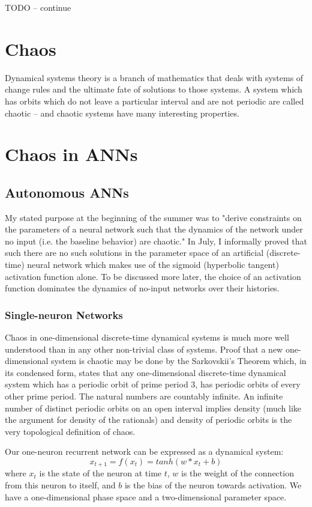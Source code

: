 \documentclass[12pt]{article}
\begin{document}
TODO -- continue

\section{Chaos}

Dynamical systems theory is a branch of mathematics that deals with systems 
of change rules and the ultimate fate of solutions to those systems.  A system
which has orbits which do not leave a particular interval and are not periodic
are called chaotic -- and chaotic systems have many interesting properties.

\section{Chaos in ANNs}
\subsection{Autonomous ANNs}
My stated purpose at the beginning of the summer was to "derive constraints
on the
parameters of a neural network such that the dynamics of the network under
no input (i.e. the baseline behavior) are chaotic."  In July,
I informally proved that such there are no such
solutions in the parameter space of an artificial (discrete-time) neural
network which makes use of the sigmoid (hyperbolic tangent) activation function
alone.  To be discussed more later, the choice of an activation function
dominates the dynamics of no-input networks over their histories.

\subsubsection{Single-neuron Networks}

Chaos in one-dimensional discrete-time dynamical systems is much more well
understood than in any other non-trivial class of systems.  Proof that
a new one-dimensional system is chaotic may be done by the Sarkovskii's Theorem
which, in its condensed form, states that any one-dimensional discrete-time dynamical system which
has a periodic orbit of prime period $3$, has periodic orbits of every other prime period.  The natural numbers are countably infinite.  An infinite number of
distinct periodic orbits on an open interval implies density (much like the argument for density of the rationals) and density of periodic orbits is the very topological definition of chaos.

Our one-neuron recurrent network can be expressed as a dynamical system:
$$x_{t+1} = f(x_{t}) = tanh(w*x_{t} + b)$$
where $x_{t}$ is the state of the neuron at time $t$, $w$ is the weight of the connection from this neuron to itself, and $b$ is the bias of the neuron towards activation.  We have a one-dimensional phase space and a two-dimensional parameter space.
\end{document}
